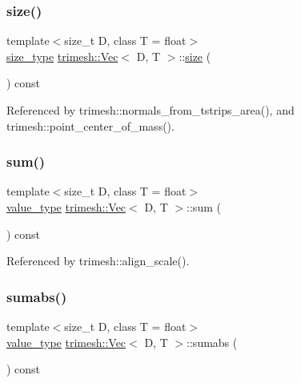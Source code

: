 \mbox{\label{classtrimesh_1_1Vec_a5244372932950795782c00aa7149e5e6}} 
\subsubsection{\texorpdfstring{size()}{size()}}
{\footnotesize\ttfamily template$<$size\+\_\+t D, class T = float$>$ \\
\hyperlink{classtrimesh_1_1Vec_a65397e05ed96e7723cf2d54dfff0ad0a}{size\+\_\+type} \hyperlink{classtrimesh_1_1Vec}{trimesh\+::\+Vec}$<$ D, T $>$\+::\hyperlink{namespacetrimesh_a1c71e2912be63f694df9e9991bddb15e}{size} (\begin{DoxyParamCaption}{ }\end{DoxyParamCaption}) const\hspace{0.3cm}{\ttfamily [inline]}}



Referenced by trimesh\+::normals\+\_\+from\+\_\+tstrips\+\_\+area(), and trimesh\+::point\+\_\+center\+\_\+of\+\_\+mass().

\mbox{\label{classtrimesh_1_1Vec_a067ed6c05d8df1235d9485d7c000b5ca}} 
\subsubsection{\texorpdfstring{sum()}{sum()}}
{\footnotesize\ttfamily template$<$size\+\_\+t D, class T = float$>$ \\
\hyperlink{classtrimesh_1_1Vec_a10a59253996e42d67c713f37592669df}{value\+\_\+type} \hyperlink{classtrimesh_1_1Vec}{trimesh\+::\+Vec}$<$ D, T $>$\+::sum (\begin{DoxyParamCaption}{ }\end{DoxyParamCaption}) const\hspace{0.3cm}{\ttfamily [inline]}}



Referenced by trimesh\+::align\+\_\+scale().

\mbox{\label{classtrimesh_1_1Vec_a8c4651f7c8cee19d66aa05d7f1b5518f}} 
\subsubsection{\texorpdfstring{sumabs()}{sumabs()}}
{\footnotesize\ttfamily template$<$size\+\_\+t D, class T = float$>$ \\
\hyperlink{classtrimesh_1_1Vec_a10a59253996e42d67c713f37592669df}{value\+\_\+type} \hyperlink{classtrimesh_1_1Vec}{trimesh\+::\+Vec}$<$ D, T $>$\+::sumabs (\begin{DoxyParamCaption}{ }\end{DoxyParamCaption}) const\hspace{0.3cm}{\ttfamily [inline]}}

